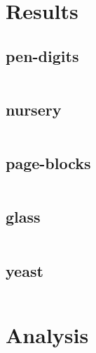 \documentclass[12pt]{article}
\begin{document}
\maketitle
\pagebreak
\tableofcontents
\pagebreak
\section{Results}
	\subsection{pen-digits}
		\begin{tabular}{llll}
		\end{tabular}
		
	\subsection{nursery}
		\begin{tabular}{llll}
		\end{tabular}
		
	\subsection{page-blocks}
		\begin{tabular}{llll}
		\end{tabular}
		
	\subsection{glass}
		\begin{tabular}{llll}
		\end{tabular}
		
	\subsection{yeast}
		\begin{tabular}{llll}
		\end{tabular}
		
\section{Analysis}
\end{document}
